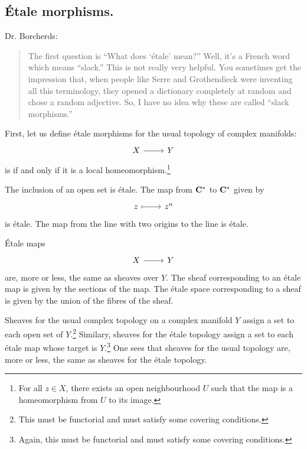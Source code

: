 \documentclass [11 pt, oneside] {article}
\begin{document}
\subsection{\'Etale morphisms.}
Dr. Borcherds:
\begin{quote}
	\small The first question is ``What does `\'etale' mean?'' Well, it's a French word which means ``slack.'' This is not really very helpful. You sometimes get the impression that, when people like Serre and Grothendieck were inventing all this terminology, they opened a dictionary completely at random and chose a random adjective. So, I have no idea why these are called ``slack morphisms.''
\end{quote}

First, let us define \'etale morphisms for the usual topology of complex manifolds:
\[
\begin{tikzcd}
	X\ar[r] & Y
\end{tikzcd}
\]
is  if and only if it is a local homeomorphism.\footnote{For all $z\in X$, there exists an open neighbourhood $U$ such that the map is a homeomorphism from $U$ to its image.}

\begin{example}[ ]\label{}\text{}
	The inclusion of an open set is \'etale.
	The map from $\mathbf C^*$ to $\mathbf C^*$ given by
	\[
	\begin{tikzcd}
		z\ar[r, mapsto] & z^n
	\end{tikzcd}
	\]
	is \'etale.
	The map from the line with two origins to the line is \'etale.
\end{example}

\'Etale maps 
\[
\begin{tikzcd}
	X\ar[r] & Y
\end{tikzcd}
\]
are, more or less, the same as sheaves over $Y$. The sheaf corresponding to an \'etale map is given by the sections of the map. 
The \'etale space corresponding to a sheaf is given by the union of the fibres of the sheaf.

Sheaves for the usual complex topology on a complex manifold $Y$ assign a set to each open set of $Y$.\footnote{This must be functorial and must satisfy some covering conditions.} 
Similary, sheaves for the \'etale topology assign a set to each \'etale map whose target is $Y$.\footnote{Again, this must be functorial and must satisfy some covering conditions.}
One sees that sheaves for the usual topology are, more or less, the same as sheaves for the \'etale topology.
\end{document}
